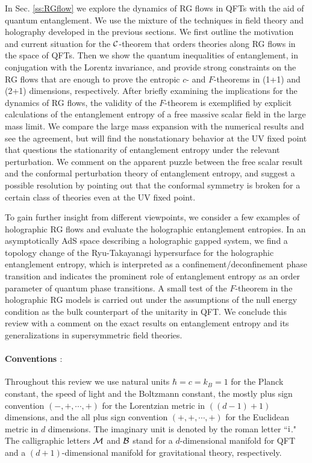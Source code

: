 In Sec. \ref{ss:RGflow} we explore the dynamics of RG flows in QFTs with the aid of quantum entanglement.
We use the mixture of the techniques in field theory and holography developed in the previous sections.
We first outline the motivation and current situation for the ${\cal C}$-theorem that orders theories along RG flows in the space of QFTs.
Then we show the quantum inequalities of entanglement, in conjugation with the Lorentz invariance, and provide strong constraints on the RG flows that are enough to prove the entropic $c$- and $F$-theorems in (1+1) and (2+1) dimensions, respectively.
After briefly examining the implications for the dynamics of RG flows, the validity of the $F$-theorem is exemplified by explicit calculations of the entanglement entropy of a free massive scalar field in the large mass limit.
We compare the large mass expansion with the numerical results and see the agreement, but will find the nonstationary behavior at the UV fixed point that questions the stationarity of entanglement entropy under the relevant perturbation.
We comment on the apparent puzzle between the free scalar result and the conformal perturbation theory of entanglement entropy, and suggest a possible resolution by pointing out that the conformal symmetry is broken for a certain class of theories even at the UV fixed point.

To gain further insight from different viewpoints, we consider a few examples of holographic RG flows and evaluate the holographic entanglement entropies.
In an asymptotically AdS space describing a holographic gapped system, 
we find a topology change of the Ryu-Takayanagi hypersurface for the holographic entanglement entropy, which is interpreted as a confinement/deconfinement phase transition and indicates the prominent role of entanglement entropy as an order parameter of quantum phase transitions.
A small test of the $F$-theorem in the holographic RG models is carried out under the assumptions of the null energy condition as the bulk counterpart of the unitarity in QFT.
We conclude this review with a comment on the exact results on entanglement entropy and its generalizations in supersymmetric field theories.


\paragraph*{Conventions $:$}
Throughout this review we use natural units $\hbar= c =  k_B  =1$ for the Planck constant, the speed of light and the Boltzmann constant,
the mostly plus sign convention $(-,+,\cdots, +)$ for the Lorentzian metric in $((d-1) +1)$ dimensions, and the all plus sign convention $(+,+,\cdots, +)$ for the Euclidean metric in $d$ dimensions.
The imaginary unit is denoted by the roman letter ``$\mathrm{i}$."
The calligraphic letters ${\cal M}$ and ${\cal B}$ stand for a $d$-dimensional manifold for QFT and a $(d+1)$-dimensional manifold for gravitational theory, respectively.


